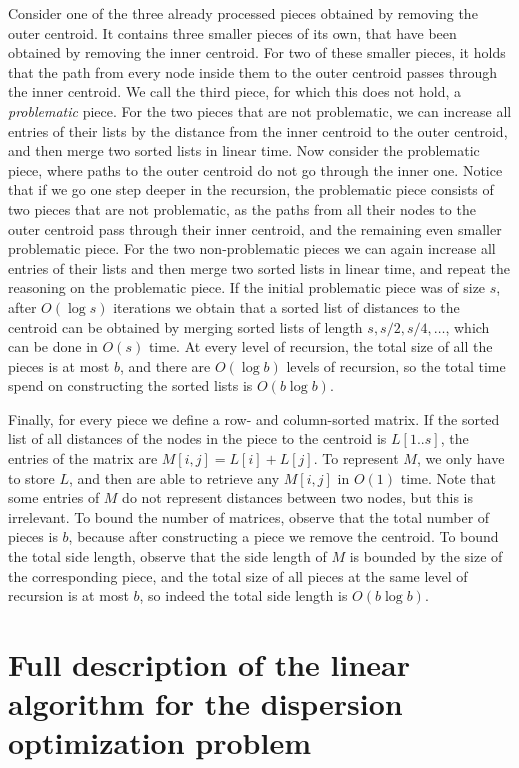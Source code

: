 \documentclass[a4paper,UKenglish]{lipics-v2016}
\theoremstyle{plain}
\begin{document}
Consider one of the three already processed pieces obtained by removing the outer centroid. It contains three smaller pieces of its own,
that have been obtained by removing the inner centroid.
For two of these smaller pieces, it holds that the path from every node inside them to the outer centroid passes through the inner centroid.
We call the third piece, for which this does not hold, a \textit{problematic} piece. For the two pieces that are not problematic, we can 
increase all entries of their lists by the distance from the inner centroid to the outer centroid, and then merge two sorted lists in linear time.
Now consider the problematic piece, where paths to the outer centroid do not go through the inner one. Notice that if we go one step deeper
in the recursion, the problematic piece consists of two pieces that are not problematic, as the paths from all their nodes to the outer centroid
pass through their inner centroid, and the remaining even smaller problematic piece. For the two non-problematic pieces we can again
increase all entries of their lists and then merge two sorted lists in linear time, and repeat the reasoning on the problematic piece.
If the initial problematic piece was of size $s$, after $O(\log s)$ iterations we obtain that a sorted list of distances to the centroid can be
obtained by merging sorted lists of length $s,s/2,s/4,\ldots$, which can be done in $O(s)$ time. At every level of recursion, 
the total size of all the pieces is at most $b$, and there are $O(\log b)$ levels of recursion, so the total time spend on constructing
the sorted lists is $O(b\log b)$.

Finally, for every piece we define a row- and column-sorted matrix. If the sorted list of all distances of the nodes in the piece to the
centroid is $L[1..s]$, the entries of the matrix are $M[i,j]=L[i]+L[j]$. To represent $M$, we only have to store $L$, and then are able to
retrieve any $M[i,j]$ in $O(1)$ time. Note that some entries of $M$ do not represent distances between two nodes, but this is irrelevant.
To bound the number of matrices, observe that the total number of pieces is $b$, because after constructing a piece we remove the centroid.
To bound the total side length, observe that the side length of $M$ is bounded by the size of the corresponding piece, and the total size
of all pieces at the same level of recursion is at most $b$, so indeed the total side length is $O(b\log b)$.

\section{Full description of the linear algorithm for the dispersion optimization problem}\label{appendix linear algorithm for the dispersion optimization problem}
\end{document}
